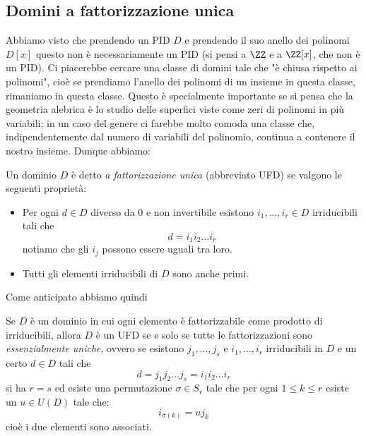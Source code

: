 \documentclass[11pt]{scrartcl}
\begin{document}
	\subsection{Domini a fattorizzazione unica}
	Abbiamo visto che prendendo un PID $D$ e prendendo il suo anello dei polinomi $D[x]$ questo non è necessariamente un PID (si pensi a $\ZZ$ e a $\ZZ[x]$, che non è un PID). Ci piacerebbe cercare una classe di domini tale che "è chiusa rispetto ai polinomi", cioè se prendiamo l'anello dei polinomi di un insieme in questa classe, rimaniamo in questa classe. Questo è specialmente importante se si pensa che la geometria alebrica è lo studio delle superfici viste come zeri di polinomi in più variabili; in un caso del genere ci farebbe molto comoda una classe che, indipendentemente dal numero di variabili del polinomio, continua a contenere il nostro insieme. Dunque abbiamo:
	\begin{definition}
		Un dominio $D$ è detto \textit{a fattorizzazione unica} (abbreviato UFD) se valgono le seguenti proprietà:
		\begin{itemize}
			\item Per ogni $d\in D$ diverso da $0$ e non invertibile esistono $i_1,\dots,i_r\in D$ irriducibili tali che 
			$$d=i_1i_2\dots i_r$$
			notiamo che gli $i_j$ possono essere uguali tra loro.
			\item Tutti gli elementi irriducibili di $D$ sono anche primi.
		\end{itemize}
	\end{definition}
	Come anticipato abbiamo quindi
	\begin{theorem}
		Se $D$ è un dominio in cui ogni elemento è fattorizzabile come prodotto di irriducibili, allora $D$ è un UFD se e solo se tutte le fattorizzazioni sono \textit{essenzialmente uniche}, ovvero se esistono $j_1,\dots,j_s$ e $i_1,\dots,i_r$ irriducibili in $D$ e un certo $d\in D$ tali che  
		$$d=j_1j_2\dots j_s=i_1i_2\dots i_r$$
		si ha $r=s$ ed esiste una permutazione $\sigma\in S_r$ tale che per ogni $1 \le k\le r$ esiste un $u\in U(D)$ tale che: 
		$$i_{\sigma(k)}=u j_k$$
		cioè i due elementi sono associati.
	\end{theorem}
\end{document}
